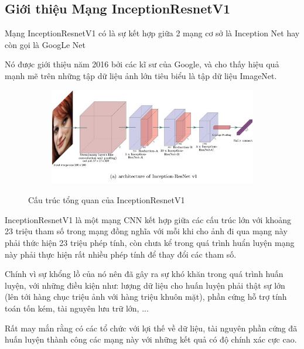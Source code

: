 \newpage
\subsection{Giới thiệu Mạng InceptionResnetV1}

Mạng InceptionResnetV1\cite{resnet} có là sự kết hợp giữa 2 mạng cơ sở là Inception Net hay còn gọi là GoogLe Net

Nó được giới thiệu năm 2016 bởi các kĩ sư của Google, và cho thấy hiệu quả mạnh mẽ trên những tập dữ liệu ảnh lớn
tiêu biểu là tập dữ liệu ImageNet.

\begin{figure}
    \begin{subfigure}{1.\textwidth}
        \begin{center}
            \includegraphics[width=1.\linewidth]{Chapters/items/chap2_19.jpg}
        \end{center}
        \label{fig: chap2_19}
    \end{subfigure}
    \caption{Cấu trúc tổng quan của InceptionResnetV1}
\end{figure}

InceptionResnetV1 là một mạng CNN kết hợp giữa các cấu trúc lớn với khoảng 23 triệu tham số trong mạng đồng nghĩa với
mỗi khi cho ảnh đi qua mạng này phải thức hiện 23 triệu phép tính, còn chưa kể trong quá trình huẩn luyện
mạng này phải thực hiện rất nhiều phép tính để thay đổi các tham số.

Chính vì sự khổng lồ của nó nên đã gây ra sự khó khăn trong quá trình huấn luyện, với những điều kiện như:
lượng dữ liệu cho huấn luyện phải thật sự lớn (lên tới hàng chục triệu ảnh với hàng triệu khuôn mặt),
phần cứng hỗ trợ tính toán tốn kém, tài nguyên lưu trữ lớn, ...

Rất may mắn rằng có các tổ chức với lợi thế về dữ liệu, tài nguyên phần cứng đã huấn luyện thành công
các mạng này với những kết quả có độ chính xác cực cao.

